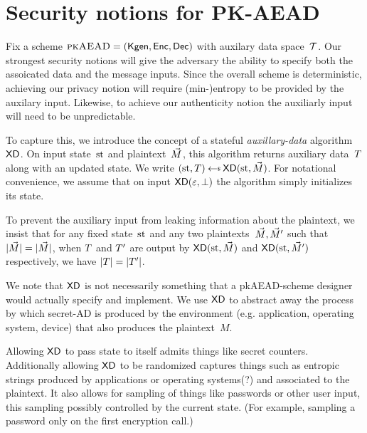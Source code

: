 
\section{Security notions for PK-AEAD} 
Fix a scheme $\textsc{pkAEAD}=(\mathsf{Kgen},{\mathsf{Enc}},{\mathsf{Dec}})$ with auxilary data space~$\mathcal{T}$.  Our strongest security notions will give the adversary the ability to specify both the assoicated data and the message inputs.  Since the overall scheme is deterministic, achieving our privacy notion will require (min-)entropy to be provided by the auxilary input.  Likewise, to achieve our authenticity notion the auxiliarly input will need to be unpredictable.

To capture this, we introduce the concept of a stateful \emph{auxillary-data} algorithm $\mathsf{XD}$.  On input state~$\mathrm{st}$ and plaintext~$\vec{M}$, this algorithm returns auxiliary data~$T$ along with an updated state.  We write $(\st,\umd) \getsr \mdalg(\st,\vmsg)$. For notational convenience, we assume that on input $\mathsf{XD}(\varepsilon,\bot)$ the algorithm simply initializes its state. 

To prevent the auxiliary input from leaking information about the plaintext, we insist that for any fixed state~$\mathrm{st}$ and any two plaintexts~$\vec{M},\vec{M}'$ such that $|\vec{M}|=|\vec{M}|$, when $T$ and $T'$ are output by $\mathsf{XD}(\mathrm{st},\vec{M})$ and $\mathsf{XD}(\mathrm{st},\vec{M}')$ respectively, we have $|T|=|T'|$. 

We note that $\mathsf{XD}$ is not necessarily something that a pkAEAD-scheme designer would actually specify and implement.  We use $\mathsf{XD}$ to abstract away the process by which secret-AD is produced by the environment (e.g. application, operating system, device) that also produces the plaintext~$M$. 

Allowing $\mathsf{XD}$ to pass state to itself admits things like secret counters.  Additionally allowing $\mathsf{XD}$ to be randomized captures things such as entropic strings produced by applications or operating systems(?) and associated to the plaintext.  It also allows for sampling of things like passwords or other user input, this sampling possibly controlled by the current state.  (For example, sampling a password only on the first encryption call.)


